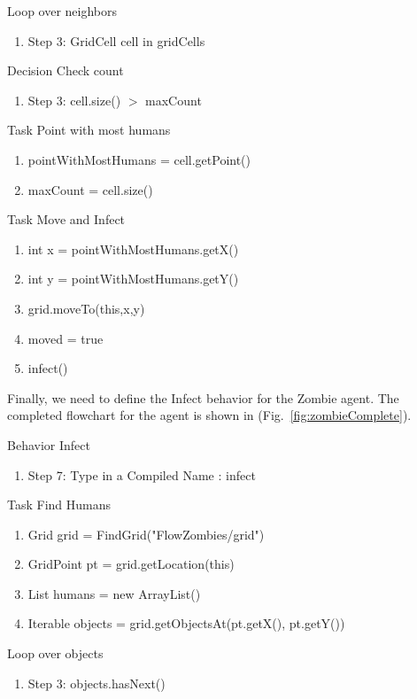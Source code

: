 \documentclass[11pt]{amsart}
\begin{document}
Loop over neighbors
\begin{enumerate}
 \item Step 3: GridCell cell in gridCells
\end{enumerate}

Decision Check count
\begin{enumerate}
 \item Step 3: cell.size() $>$ maxCount
\end{enumerate}

Task Point with most humans
\begin{enumerate}
 \item pointWithMostHumans = cell.getPoint()
 \item maxCount = cell.size()
\end{enumerate}

Task Move and Infect
\begin{enumerate}
 \item int x = pointWithMostHumans.getX()
 \item int y = pointWithMostHumans.getY()
 \item grid.moveTo(this,x,y)
 \item moved = true
 \item infect()
\end{enumerate}

Finally, we need to define the Infect behavior for the Zombie agent.  The completed flowchart for the agent is shown in (Fig.~\ref{fig:zombieComplete}).

Behavior Infect
\begin{enumerate}
 \item Step 7: Type in a Compiled Name : infect
\end{enumerate}

Task Find Humans
\begin{enumerate}
 \item Grid grid = FindGrid("FlowZombies/grid")
 \item GridPoint pt = grid.getLocation(this)
 \item List humans = new ArrayList()
 \item Iterable objects = grid.getObjectsAt(pt.getX(), pt.getY())
\end{enumerate}

Loop over objects
\begin{enumerate}
 \item Step 3: objects.hasNext()
\end{enumerate}
\end{document}
